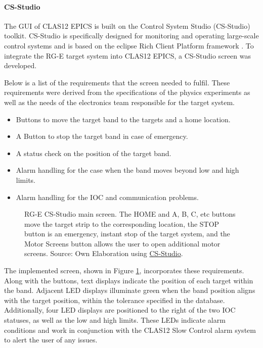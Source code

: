 \paragraph{CS-Studio}
    The GUI of CLAS12 EPICS is built on the Control System Studio (CS-Studio) toolkit.
    CS-Studio is specifically designed for monitoring and operating large-scale control systems and is based on the eclipse Rich Client Platform framework \cite{kasemir2007}.
    To integrate the RG-E target system into CLAS12 EPICS, a CS-Studio screen was developed.

    Below is a list of the requirements that the screen needed to fulfil.
    These requirements were derived from the specifications of the physics experiments as well as the needs of the electronics team responsible for the target system.

    \begin{itemize}
        \item
            Buttons to move the target band to the targets and a home location.
        \item
            A Button to stop the target band in case of emergency.
        \item
            A status check on the position of the target band.
        \item
            Alarm handling for the case when the band moves beyond low and high limits.
        \item
            Alarm handling for the IOC and communication problems.
    \end{itemize}

    \begin{figure}[b!]
        \centering{}
        \caption[RG-E CS-Studio main screen]{RG-E CS-Studio main screen. The HOME and A, B, C, etc buttons move the target strip to the corresponding location, the STOP button is an emergency, instant stop of the target system, and the Motor Screens button allows the user to open additional motor screens.
        Source: Own Elaboration using \href{https://controlsystemstudio.org/}{CS-Studio}.}
        \label{fig::11.312::rge_motorx}
    \end{figure}

    The implemented screen, shown in Figure \ref{fig::11.312::rge_motorx}, incorporates these requirements.
    Along with the buttons, text displays indicate the position of each target within the band.
    Adjacent LED displays illuminate green when the band position aligns with the target position, within the tolerance specified in the database.
    Additionally, four LED displays are positioned to the right of the two IOC statuses, as well as the low and high limits.
    These LEDs indicate alarm conditions and work in conjunction with the CLAS12 Slow Control alarm system to alert the user of any issues.

